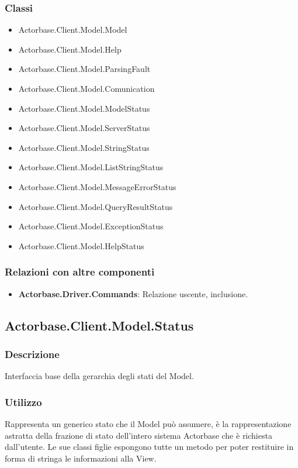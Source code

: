 \documentclass[a4paper]{article}
\begin{document}
		\subsubsection{Classi}
			\begin{itemize}
				\item Actorbase.Client.Model.Model
				\item Actorbase.Client.Model.Help
				\item Actorbase.Client.Model.ParsingFault
				\item Actorbase.Client.Model.Comunication
				\item Actorbase.Client.Model.ModelStatus
				\item Actorbase.Client.Model.ServerStatus
				\item Actorbase.Client.Model.StringStatus
				\item Actorbase.Client.Model.ListStringStatus
				\item Actorbase.Client.Model.MessageErrorStatus
				\item Actorbase.Client.Model.QueryResultStatus
				\item Actorbase.Client.Model.ExceptionStatus
				\item Actorbase.Client.Model.HelpStatus
			\end{itemize}
		\subsubsection{Relazioni con altre componenti}
				\begin{itemize}
					\item \textbf{Actorbase.Driver.Commands}: Relazione uscente, inclusione.
				\end{itemize}	
		
		\subsection{Actorbase.Client.Model.Status}
			\subsubsection{Descrizione}
				Interfaccia base della gerarchia degli stati del Model.
			\subsubsection{Utilizzo}
				Rappresenta un generico stato che il Model può assumere, è la rappresentazione astratta della frazione di stato dell'intero sistema Actorbase che è richiesta dall'utente. Le sue classi figlie espongono tutte un metodo per poter restituire in forma di stringa le informazioni alla View.
\end{document}
